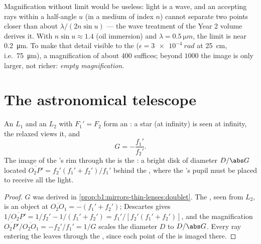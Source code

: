 \begin{remark}\label{rem:b1:optical-instruments:abbe}
Magnification without limit would be useless: light is a wave, and an
 accepting rays within a half-angle $u$ (in a medium of index
$n$) cannot separate two points closer than about
$\lambda/(2n\sin u)$ --- the wave treatment of the Year 2 volume derives
it. With $n\sin u \approx 1.4$ (oil immersion) and $\lambda =
\qty{0.5}{\micro m}$, the limit is near \qty{0.2}{\micro m}. To make
that detail visible to the  ($\epsilon = \qty{3e-4}{rad}$ at
\qty{25}{cm}, i.e.\ \qty{75}{\micro m}), a magnification of about $400$
suffices; beyond $1000$ the image is only larger, not richer:
\emph{empty magnification}.
\end{remark}

\section{The astronomical telescope}

\begin{proposition}\label{prop:b1:optical-instruments:telescope}
An  $L_1$ and an  $L_2$ with $F_1' = F_2$ form an
: a star (at infinity) is seen at infinity, the relaxed
 views it, and
\[
G = -\frac{f_1'}{f_2'} .
\]
The image of the 's rim through the  is the
\emph{}: a bright disk of diameter $D/\abs G$ located
$\overline{O_2P'} = f_2'(f_1' + f_2')/f_1'$ behind the , where
the 's pupil must be placed to receive all the light.
\end{proposition}

\begin{proof}
$G$ was derived in \cref{prop:b1:mirrors-thin-lenses:doublet}. The
, seen from $L_2$, is an object at $\overline{O_2O_1} = -(f_1'
+ f_2')$; Descartes gives $1/\overline{O_2P'} = 1/f_2' - 1/(f_1' + f_2')
= f_1'/[f_2'(f_1' + f_2')]$, and the magnification $\overline{O_2P'}/
\overline{O_2O_1} = -f_2'/f_1' = 1/G$ scales the diameter $D$ to
$D/\abs G$. Every ray entering the  leaves through the , since each point of the  is imaged there.
\end{proof}

